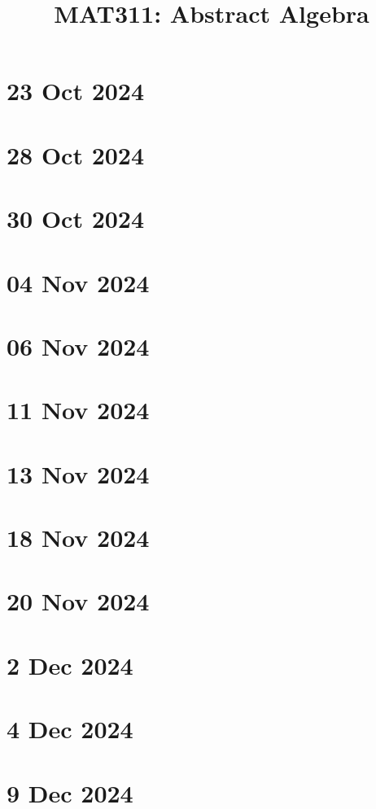 \documentclass[a4paper]{report}
\title{MAT311: Abstract Algebra}
\begin{document}
   \maketitle
   
   \newpage
   \tableofcontents
   \newpage
   \setcounter{chapter}{-1}
   \chapter{23 Oct 2024}
   
   \chapter{28 Oct 2024}
   
   \chapter{30 Oct 2024}
   
   \chapter{04 Nov 2024}
   
   \chapter{06 Nov 2024}
   
   \chapter{11 Nov 2024}
   
   \chapter{13 Nov 2024}
   
   \chapter{18 Nov 2024}
   
   \chapter{20 Nov 2024}
   
   \chapter{2 Dec 2024}
   
   \chapter{4 Dec 2024}
   
   \chapter{9 Dec 2024}
   
\end{document}
